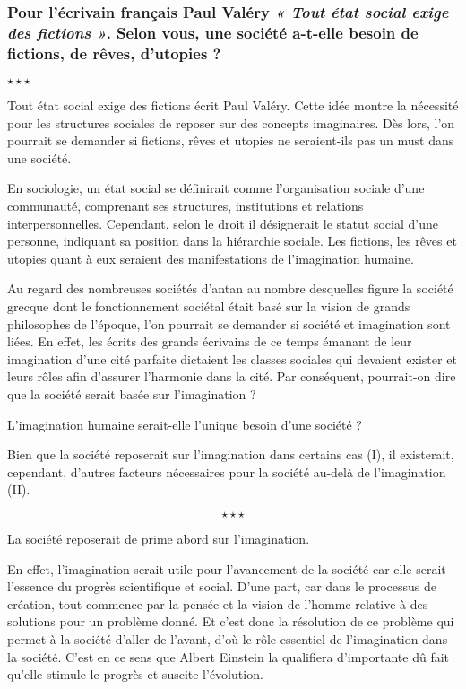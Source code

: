 \begin{center}
	\subsubsection*{Pour l’écrivain français Paul Valéry \textit{« Tout état social exige des fictions »}.  Selon vous, une société a-t-elle besoin de fictions, de rêves, d’utopies ? }
	$\star \star \star$
\end{center}

Tout état social exige des fictions écrit Paul Valéry. Cette idée montre la nécessité pour les structures sociales de reposer sur des concepts imaginaires. Dès lors, l'on pourrait se demander si fictions, rêves et utopies ne seraient-ils pas un must dans une société.

En sociologie, un état social se définirait comme l'organisation sociale d'une communauté, comprenant ses structures, institutions et relations interpersonnelles. Cependant, selon le droit il désignerait le statut social d'une personne, indiquant sa position dans la hiérarchie sociale. Les fictions, les rêves et utopies quant à eux seraient des manifestations de l'imagination humaine. 

Au regard des nombreuses sociétés d'antan au nombre desquelles figure la société grecque dont le fonctionnement sociétal était basé sur la vision de grands philosophes de l'époque, l'on pourrait se demander si société et imagination sont liées. En effet, les écrits des grands écrivains de ce temps émanant de leur imagination d'une cité parfaite dictaient les classes sociales qui devaient exister et leurs rôles afin d'assurer l'harmonie dans la cité. Par conséquent, pourrait-on dire que la société serait basée sur l'imagination ?

L'imagination humaine serait-elle l'unique besoin d'une société ?

Bien que la société reposerait sur l'imagination dans certains cas (I), il existerait, cependant, d'autres facteurs nécessaires pour la société au-delà de l'imagination (II).

$$\star \star \star$$

La société reposerait de prime abord sur l'imagination. 

En effet, l'imagination serait utile pour l'avancement de la société car elle serait l'essence du progrès scientifique et social. D'une part, car dans le processus de création, tout commence par la pensée et la vision de l'homme relative à des solutions pour un problème donné. Et c'est donc la résolution de ce problème qui permet à la société d'aller de l'avant, d'où le rôle essentiel de l'imagination dans la société. C'est en ce sens que Albert Einstein la qualifiera d'importante dû fait qu'elle stimule le progrès et suscite l'évolution.


